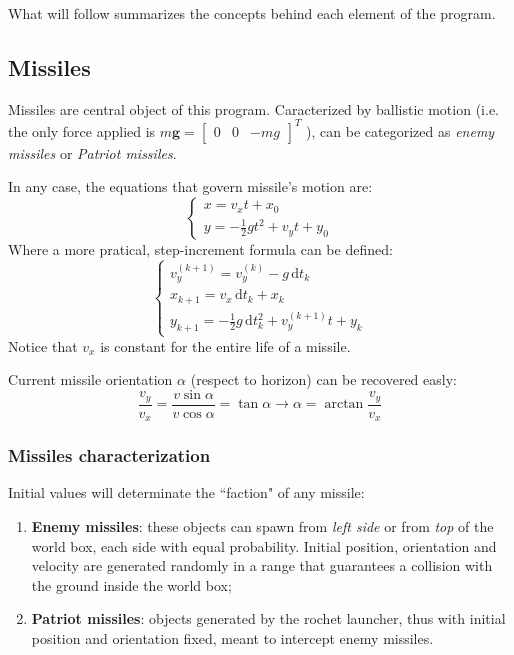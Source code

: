 \documentclass[notitlepage,a4paper,10pt]{article} %
\newcommand{\ud}{\,\mathrm{d}} %
\begin{document}
	What will follow summarizes the concepts behind each element of the program.

	\subsection{Missiles}

		Missiles are central object of this program. Caracterized by ballistic motion (i.e. the only force applied is
		$m\bm{g} = \begin{bmatrix} 0 & 0 & -mg \end{bmatrix} ^T$
		), can be categorized as \emph{enemy missiles} or \emph{Patriot missiles}.

		In any case, the equations that govern missile's motion are:
		\begin{equation}
			\begin{cases}
				x = v_x t + x_0 \\
				y = - \frac{1}{2} g t^2 + v_y t + y_0
			\end{cases}
		\end{equation}
		Where a more pratical, step-increment formula can be defined:
		\begin{equation}
			\begin{cases}
				v_y^{(k+1)} = v_y^{(k)} - g \ud t_k \\
				x_{k+1} = v_x \ud t_k + x_k \\
				y_{k+1} = - \frac{1}{2} g \ud t_k^2 + v_y^{(k+1)} t + y_k
			\end{cases}
		\end{equation}
		Notice that $v_x$ is constant for the entire life of a missile.

		Current missile orientation $\alpha$ (respect to horizon) can be recovered easly:
		\begin{equation}
			\frac{v_y}{v_x} = \frac{v \sin{\alpha}}{v \cos{\alpha}} = \tan{\alpha}
			\to \alpha = \arctan{\frac{v_y}{v_x}}
		\end{equation}

		\subsubsection{Missiles characterization}

			Initial values will determinate the ``faction" of any missile:

			\begin{enumerate}

				\item \textbf{Enemy missiles}: these objects can spawn from \emph{left side} or from \emph{top} of the world box, each side with equal probability. Initial position, orientation and velocity are generated randomly in a range that guarantees a collision with the ground inside the world box;
				\item \textbf{Patriot missiles}: objects generated by the rochet launcher, thus with initial position and orientation fixed, meant to intercept enemy missiles.
			\end{enumerate}
\end{document}
